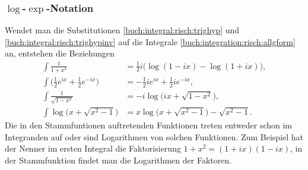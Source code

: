 \subsubsection{$\log$-$\exp$-Notation}
Wendet man die Substitutionen
\eqref{buch:integral:risch:trighyp}
und
\eqref{buch:integral:risch:trighypinv}
auf die Integrale
\eqref{buch:integration:risch:allgform}
an, entstehen die Beziehungen
\begin{equation}
\begin{aligned}
\int\frac{1}{1+x^2}
&=
\frac12i\bigl(
\log(1-ix) - \log(1+ix)
\bigr),
\\
\int\bigl(
{\textstyle\frac12}
e^{ix}
+
{\textstyle\frac12}
e^{-ix}
\bigr)
&=
-{\textstyle\frac12}ie^{ix}
+{\textstyle\frac12}ie^{-ix},
\\
\int
\frac{1}{\sqrt{1-x^2}}
&=
-i\log\bigl(ix+\sqrt{1-x^2}),
\\
\int \log\bigl(x+\sqrt{x^2-1}\bigr)
&=
x\log\bigl(x+\sqrt{x^2-1}\bigr) - \sqrt{x^2-1}.
\end{aligned}
\label{buch:integration:risch:eqn:integralbeispiel2}
\end{equation}
Die in den Stammfuntionen auftretenden Funktionen treten entweder
schon im Integranden auf oder sind Logarithmen von solchen
Funktionen.
Zum Beispiel hat der Nenner im ersten Integral die Faktorisierung
$1+x^2=(1+ix)(1-ix)$, in der Stammfunktion findet man die Logarithmen
der Faktoren.


